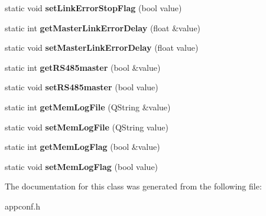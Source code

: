 \begin{DoxyCompactItemize}
\item 
\hypertarget{classAppConf_aea3667b45ba078619fa606261e696d83}{static void {\bfseries set\-Link\-Error\-Stop\-Flag} (bool value)}\label{classAppConf_aea3667b45ba078619fa606261e696d83}

\item 
\hypertarget{classAppConf_ad49dc75f8fca13dc2c20490f01298e9d}{static int {\bfseries get\-Master\-Link\-Error\-Delay} (float \&value)}\label{classAppConf_ad49dc75f8fca13dc2c20490f01298e9d}

\item 
\hypertarget{classAppConf_a6caaa2d7100aa241921b81d90e503fa7}{static void {\bfseries set\-Master\-Link\-Error\-Delay} (float value)}\label{classAppConf_a6caaa2d7100aa241921b81d90e503fa7}

\item 
\hypertarget{classAppConf_a0b16198e303c031420de65acab491200}{static int {\bfseries get\-R\-S485master} (bool \&value)}\label{classAppConf_a0b16198e303c031420de65acab491200}

\item 
\hypertarget{classAppConf_a01b2737b72a60b13ff6563f4521697c1}{static void {\bfseries set\-R\-S485master} (bool value)}\label{classAppConf_a01b2737b72a60b13ff6563f4521697c1}

\item 
\hypertarget{classAppConf_a8d6b3338c34df03ab0ec5eabfdfb95c7}{static int {\bfseries get\-Mem\-Log\-File} (Q\-String \&value)}\label{classAppConf_a8d6b3338c34df03ab0ec5eabfdfb95c7}

\item 
\hypertarget{classAppConf_a7519e15c7b7ead25ff937b2fe0d0e3c3}{static void {\bfseries set\-Mem\-Log\-File} (Q\-String value)}\label{classAppConf_a7519e15c7b7ead25ff937b2fe0d0e3c3}

\item 
\hypertarget{classAppConf_a65ea3be969e658d6452a4c14848cf157}{static int {\bfseries get\-Mem\-Log\-Flag} (bool \&value)}\label{classAppConf_a65ea3be969e658d6452a4c14848cf157}

\item 
\hypertarget{classAppConf_a5eb96466913b0de9184e314f307270cb}{static void {\bfseries set\-Mem\-Log\-Flag} (bool value)}\label{classAppConf_a5eb96466913b0de9184e314f307270cb}

\end{DoxyCompactItemize}


The documentation for this class was generated from the following file\-:\begin{DoxyCompactItemize}
\item 
appconf.\-h\end{DoxyCompactItemize}
